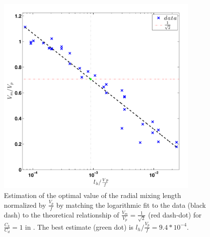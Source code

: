 \documentclass[12pt]{article}
\begin{document}
\begin{figure}[h!]
\centering
  \noindent\includegraphics[width=10cm,height=10cm]{FIGURES_TC_RCE_equilibrium_v2.0/Fig10_lh_optimize.pdf}
\caption{Estimation of the optimal value of the radial mixing length normalized by $\frac{V_p}{f}$ by matching the logarithmic fit to the data (black dash) to the theoretical relationship of $\frac{V_m}{V_p} = \frac{1}{\sqrt{2}}$ (red dash-dot) for $\frac{C_k}{C_d} = 1$ in \cite{Emanuel_Rotunno_2011}. The best estimate (green dot) is $l_h / \frac{V_p}{f} = 9.4*10^{-4}$.}
\label{fig:lh_optimize}
\end{figure}
\end{document}
